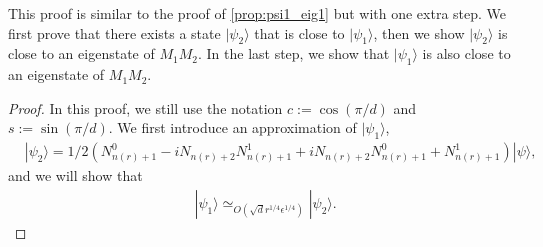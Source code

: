 \documentclass[11pt,letterpaper]{article}
\newcommand{\ket}[1]{|#1\rangle}
\DeclarePairedDelimiter{\norm}{\lVert}{\rVert}
\newcommand{\1}{\mathbb{1}}
\newcommand{\nr}{n(r)}
\newcommand{\ep}{\epsilon}
\newcommand{\qe}{\epsilon^{1/4}}
\newcommand{\sd}{\sqrt{d}}
\newcommand{\qr}{r^{1/4}}
\newcommand{\appd}[1]{\simeq_{#1}}
\theoremstyle{definition}
\begin{document}
This proof is similar to the proof of \cref{prop:psi1_eig1} but with one extra step. 
We first prove that there exists a state $\ket{\psi_2}$ that is
close to $\ket{\psi_1}$, 
then we show $\ket{\psi_2}$ is close to an eigenstate of $M_1M_2$. 
In the last step, we show that
$\ket{\psi_1}$ is also close to an eigenstate of $M_1M_2$.
\begin{proof}
    In this proof, we still use the notation $c := \cos(\pi/d)$ and $s := \sin(\pi/d)$. 
	We first introduce an approximation of $\ket{\psi_1}$,  
	\begin{align}
	    \label{eq:psi2}
	    &\ket{\psi_2} =1/2 (N_{\nr+1}^0 - iN_{\nr+2}N_{\nr+1}^1+iN_{\nr+2}N_{\nr+1}^0 + N_{\nr+1}^1)\ket{\psi},
	\end{align}
	and we will show that 
	\begin{align}
	    \label{eq:psi1_eq} &\ket{\psi_1} \appd{O(\sd \qr\qe)} \ket{\psi_2}.
	\end{align}
	

\end{proof}
\end{document}
